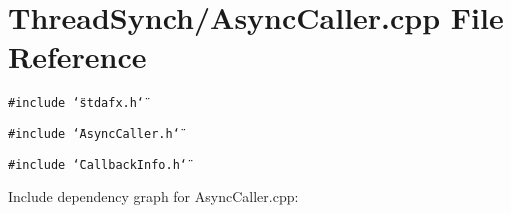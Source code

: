 \section{Thread\-Synch/Async\-Caller.cpp File Reference}
\label{_async_caller_8cpp}
{\tt \#include \char`\"{}stdafx.h\char`\"{}}\par
{\tt \#include \char`\"{}Async\-Caller.h\char`\"{}}\par
{\tt \#include \char`\"{}Callback\-Info.h\char`\"{}}\par


Include dependency graph for Async\-Caller.cpp: